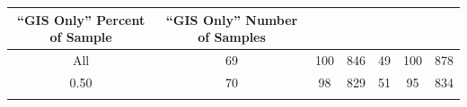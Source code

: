 \documentclass[12pt,]{article}
\begin{document}
\begin{longtable}[c]{@{}ccccccc@{}}
\begin{minipage}[b]{0.13\columnwidth}
``GIS Only'' Percent of Sample
\strut\end{minipage} &
\begin{minipage}[b]{0.13\columnwidth}\centering\strut
``GIS Only'' Number of Samples
\strut\end{minipage}\tabularnewline
\midrule
\endhead
\begin{minipage}[t]{0.08\columnwidth}\centering\strut
All
\strut\end{minipage} &
\begin{minipage}[t]{0.11\columnwidth}\centering\strut
69
\strut\end{minipage} &
\begin{minipage}[t]{0.13\columnwidth}\centering\strut
100
\strut\end{minipage} &
\begin{minipage}[t]{0.13\columnwidth}\centering\strut
846
\strut\end{minipage} &
\begin{minipage}[t]{0.11\columnwidth}\centering\strut
49
\strut\end{minipage} &
\begin{minipage}[t]{0.13\columnwidth}\centering\strut
100
\strut\end{minipage} &
\begin{minipage}[t]{0.13\columnwidth}\centering\strut
878
\strut\end{minipage}\tabularnewline
\begin{minipage}[t]{0.08\columnwidth}\centering\strut
0.50
\strut\end{minipage} &
\begin{minipage}[t]{0.11\columnwidth}\centering\strut
70
\strut\end{minipage} &
\begin{minipage}[t]{0.13\columnwidth}\centering\strut
98
\strut\end{minipage} &
\begin{minipage}[t]{0.13\columnwidth}\centering\strut
829
\strut\end{minipage} &
\begin{minipage}[t]{0.11\columnwidth}\centering\strut
51
\strut\end{minipage} &
\begin{minipage}[t]{0.13\columnwidth}\centering\strut
95
\strut\end{minipage} &
\begin{minipage}[t]{0.13\columnwidth}\centering\strut
834
\strut\end{minipage}\tabularnewline
\begin{minipage}[t]{0.08\columnwidth}\centering\strut

\end{minipage}
\end{longtable}
\end{document}
